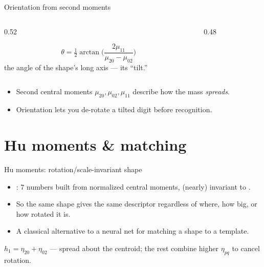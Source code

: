 \documentclass[10pt,aspectratio=169]{beamer}
\begin{document}
\begin{frame}{Orientation from second moments}
  \begin{columns}[T]
    \begin{column}{0.52\textwidth}
      \begin{mathbox}
        \[ \theta=\tfrac12\arctan\!\Big(\frac{2\mu_{11}}{\mu_{20}-\mu_{02}}\Big) \]
        the angle of the shape's long axis — its ``tilt.''
      \end{mathbox}
    \end{column}
    \begin{column}{0.48\textwidth}
    \begin{center}
    \end{center}
    \end{column}
  \end{columns}
  \begin{itemize}\scriptsize
    \item Second central moments $\mu_{20},\mu_{02},\mu_{11}$ describe how the mass \emph{spreads}.
    \item Orientation lets you de-rotate a tilted digit before recognition.
  \end{itemize}
\end{frame}

\section{Hu moments \& matching}

\begin{frame}{Hu moments: rotation/scale-invariant shape}
  \begin{itemize}
    \item {}: 7 numbers built from normalized central moments, (nearly) invariant to
          .
    \item So the same shape gives the same descriptor regardless of where, how big, or how rotated it is.
    \item A classical alternative to a neural net for matching a shape to a template.
  \end{itemize}
  \begin{mathbox}
    \( h_1=\eta_{20}+\eta_{02} \) — spread about the centroid; the rest combine higher $\eta_{pq}$ to cancel rotation.
  \end{mathbox}
\end{frame}
\end{document}
